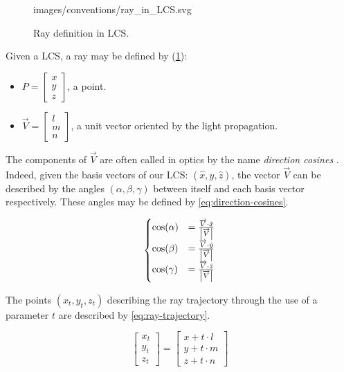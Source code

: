 \begin{figure} \caption{\label{fig:ray-in-LCS} Ray definition
in \gls{LCS}.}

           {images/conventions/ray_in_LCS.svg}
\end{figure}

Given a \gls{LCS}, a ray may be defined by (\cref{fig:ray-in-LCS}):
\begin{itemize}
\item $P = \begin{bmatrix}x \\ y \\ z \end{bmatrix}$, a point.
\item $\overrightarrow{V} = \begin{bmatrix} l \\ m \\ n \end{bmatrix}$, a unit
vector oriented by the light propagation.
\end{itemize}

The components of $\overrightarrow{V}$ are often called in optics by the name
\emph{direction cosines} \cite{mathworld:direction-cosine}. Indeed, given the
basis vectors of our \gls{LCS}: $(\hat{x}, \hat{y}, \hat{z})$, the vector
$\overrightarrow{V}$ can be described by the angles $(\alpha, \beta, \gamma)$
between itself and each basis vector respectively. These angles may be defined
by \cref{eq:direction-cosines}.

\begin{equation} \label{eq:direction-cosines}
\begin{cases}
\cos(\alpha) &= \frac{\overrightarrow{V} \cdot \hat{x}}
                     {\abs{\overrightarrow{V}}} \\
\cos(\beta) &= \frac{\overrightarrow{V} \cdot \hat{y}}
                    {\abs{\overrightarrow{V}}} \\
\cos(\gamma) &= \frac{\overrightarrow{V} \cdot \hat{z}}
                     {\abs{\overrightarrow{V}}}
\end{cases}
\end{equation}

The points $(x_t, y_t, z_t)$ describing the ray trajectory through the use of a parameter $t$
are described by \cref{eq:ray-trajectory}.

\begin{equation} \label{eq:ray-trajectory}
\begin{bmatrix}
x_t \\ y_t \\ z_t
\end{bmatrix} =
\begin{bmatrix}
x + t \cdot l \\
y + t \cdot m \\
z + t \cdot n
\end{bmatrix}
\end{equation}

